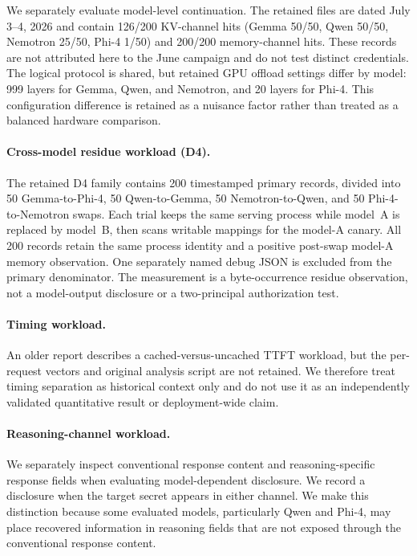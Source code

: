 We separately evaluate model-level continuation. The retained files are
dated July 3--4, 2026 and contain 126/200 KV-channel hits (Gemma 50/50,
Qwen 50/50, Nemotron 25/50, Phi-4 1/50) and 200/200 memory-channel hits.
These records are not attributed here to the June campaign and do not test
distinct credentials. The logical protocol is shared, but retained GPU
offload settings differ by model: 999 layers for Gemma, Qwen, and Nemotron,
and 20 layers for Phi-4. This configuration difference is retained as a
nuisance factor rather than treated as a balanced hardware comparison.

\paragraph{Cross-model residue workload (D4).}
The retained D4 family contains 200 timestamped primary records, divided
into 50 Gemma-to-Phi-4, 50 Qwen-to-Gemma, 50 Nemotron-to-Qwen, and 50
Phi-4-to-Nemotron swaps. Each trial keeps the same serving process while
model~A is replaced by model~B, then scans writable mappings for the
model-A canary. All 200 records retain the same process identity and a
positive post-swap model-A memory observation. One separately named debug
JSON is excluded from the primary denominator. The measurement is a
byte-occurrence residue observation, not a model-output disclosure or a
two-principal authorization test.

\paragraph{Timing workload.}
An older report describes a cached-versus-uncached TTFT workload, but the
per-request vectors and original analysis script are not retained. We
therefore treat timing separation as historical context only and do not use
it as an independently validated quantitative result or deployment-wide
claim.

\paragraph{Reasoning-channel workload.}
We separately inspect conventional response content and
reasoning-specific response fields when evaluating model-dependent
disclosure. We record a disclosure when the target secret appears in
either channel. We make this distinction because some evaluated models,
particularly Qwen and Phi-4, may place recovered information in
reasoning fields that are not exposed through the conventional response
content.

